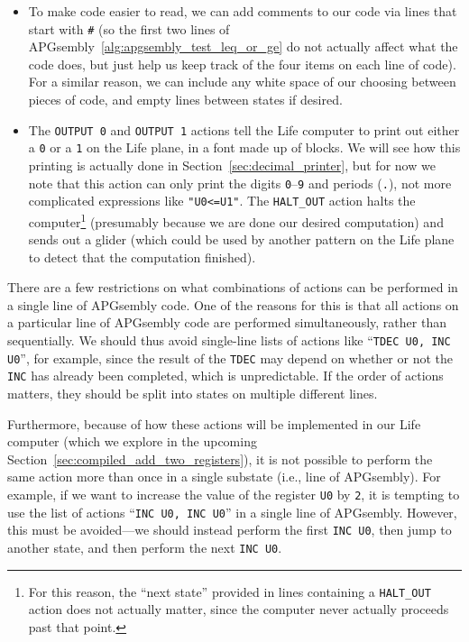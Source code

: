 \begin{itemize}
	\item To make code easier to read, we can add comments to our code via lines that start with \texttt{\#} (so the first two lines of APGsembly~\ref{alg:apgsembly_test_leq_or_ge} do not actually affect what the code does, but just help us keep track of the four items on each line of code). For a similar reason, we can include any white space of our choosing between pieces of code, and empty lines between states if desired.\smallskip
	
	\item The \texttt{OUTPUT 0} and \texttt{OUTPUT 1} actions tell the Life computer to print out either a \texttt{0} or a \texttt{1} on the Life plane, in a font made up of blocks. We will see how this printing is actually done in Section~\ref{sec:decimal_printer}, but for now we note that this action can only print the digits \texttt{0}--\texttt{9} and periods (\texttt{.}), not more complicated expressions like \texttt{"U0<=U1"}. The \texttt{HALT\_OUT} action halts the computer\footnote{For this reason, the ``next state'' provided in lines containing a \texttt{HALT\_OUT} action does not actually matter, since the computer never actually proceeds past that point.} (presumably because we are done our desired computation) and sends out a glider (which could be used by another pattern on the Life plane to detect that the computation finished).\smallskip
\end{itemize}

There are a few restrictions on what combinations of actions can be performed in a single line of APGsembly code. One of the reasons for this is that all actions on a particular line of APGsembly code are performed simultaneously, rather than sequentially. We should thus avoid single-line lists of actions like ``\texttt{TDEC U0, INC U0}'', for example, since the result of the \texttt{TDEC} may depend on whether or not the \texttt{INC} has already been completed, which is unpredictable. If the order of actions matters, they should be split into states on multiple different lines.

Furthermore, because of how these actions will be implemented in our Life computer (which we explore in the upcoming Section~\ref{sec:compiled_add_two_registers}), it is not possible to perform the same action more than once in a single substate (i.e., line of APGsembly). For example, if we want to increase the value of the register \texttt{U0} by \texttt{2}, it is tempting to use the list of actions ``\texttt{INC U0, INC U0}'' in a single line of APGsembly. However, this must be avoided---we should instead perform the first \texttt{INC U0}, then jump to another state, and then perform the next \texttt{INC U0}.

